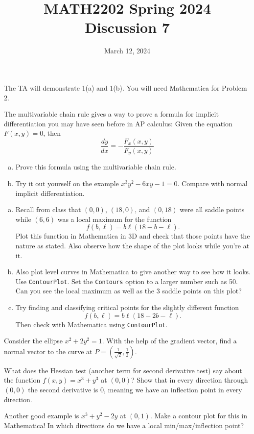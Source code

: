 \documentclass[11pt,oneside]{amsart}
\title{MATH2202 Spring 2024\\
Discussion 7}
\date{March 12, 2024}
\theoremstyle{definition}
\begin{document}
  \maketitle

  The TA will demonstrate 1(a) and 1(b). You will need Mathematica for Problem 2.

  \begin{problem}
    The multivariable chain rule gives a way to prove a formula for implicit differentiation you may have seen before in AP calculus: Given the equation $F(x,y)=0$, then
    \[\frac{dy}{dx}=-\frac{F_x(x,y)}{F_y(x,y)}\]
    \begin{enumerate}[(a)]
      \item Prove this formula using the multivariable chain rule.
      \item Try it out yourself on the example $x^3y^2-6xy-1=0$. Compare with normal implicit differentiation.
    \end{enumerate}
  \end{problem}

  \begin{problem}\leavevmode
    \begin{enumerate}[(a)]
      \item Recall from class that $(0,0)$, $(18,0)$, and $(0,18)$ were all saddle points while $(6,6)$ was a local maximum for the function
      \[f(b,\ell)=b\ell(18-b-\ell).\]
      Plot this function in Mathematica in 3D and check that those points have the nature as stated. Also observe how the shape of the plot looks while you're at it.
      \item Also plot level curves in Mathematica to give another way to see how it looks. Use \texttt{ContourPlot}. Set the \texttt{Contours} option to a larger number such as 50. Can you see the local maximum as well as the 3 saddle points on this plot?
      \item Try finding and classifying critical points for the slightly different function
      \[f(b,\ell)=b\ell(18-2b-\ell).\]
      Then check with Mathematica using \texttt{ContourPlot}.
    \end{enumerate}
  \end{problem}

  \begin{problem}
    Consider the ellipse $x^2+2y^2=1$. With the help of the gradient vector, find a normal vector to the curve at $P=\left( \frac1{\sqrt2},\frac12 \right)$.
  \end{problem}

  \begin{problem}
    What does the Hessian test (another term for second derivative test) say about the function $f(x,y)=x^3+y^3$ at $(0,0)$? Show that in every direction through $(0,0)$ the second derivative is 0, meaning we have an inflection point in every direction.

    Another good example is $x^3+y^2-2y$ at $(0,1)$. Make a contour plot for this in Mathematica! In which directions do we have a local min/max/inflection point?
  \end{problem}
\end{document}
